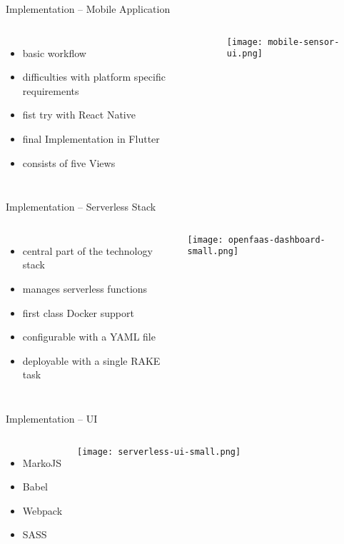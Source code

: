 \documentclass[aspectratio=1610]{beamer}
\begin{document}
  \begin{frame}{Implementation -- Mobile Application}
    \begin{columns}
        \begin{itemize}
          \item basic workflow
          \item difficulties with platform specific requirements
          \item fist try with React Native
          \item final Implementation in Flutter
          \item consists of five Views
        \end{itemize}
        \vfill
        \centering
        \texttt{[image: mobile-sensor-ui.png]}
     \end{columns}
  \end{frame}

  \begin{frame}{Implementation -- Serverless Stack}
    \begin{columns}
        \begin{itemize}
          \item central part of the technology stack
          \item manages serverless functions
          \item first class Docker support
          \item configurable with a YAML file
          \item deployable with a single RAKE task
        \end{itemize}
        \vfill
        \centering
        \texttt{[image: openfaas-dashboard-small.png]}
     \end{columns}
  \end{frame}

  \begin{frame}{Implementation -- UI}
    \begin{columns}
        \begin{itemize}
          \item MarkoJS
          \item Babel
          \item Webpack
          \item SASS
        \end{itemize}
        \vfill
        \centering
        \texttt{[image: serverless-ui-small.png]}
     \end{columns}
  \end{frame}
\end{document}
